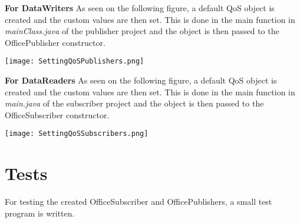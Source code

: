 \textbf{For DataWriters}
As seen on the following figure, a default QoS object is created and the custom values are then set. This is done in the main function in \textit{mainClass.java} of the publisher project and the object is then passed to the OfficePublisher constructor.
\begin{center}
	\texttt{[image: SettingQoSPublishers.png]}
\end{center}

\textbf{For DataReaders}
As seen on the following figure, a default QoS object is created and the custom values are then set. This is done in the main function in \textit{main.java} of the subscriber project and the object is then passed to the OfficeSubscriber constructor.
\begin{center}
	\texttt{[image: SettingQoSSubscribers.png]}
\end{center}

\section{Tests}
For testing the created OfficeSubscriber and OfficePublishers, a small test program is written. 